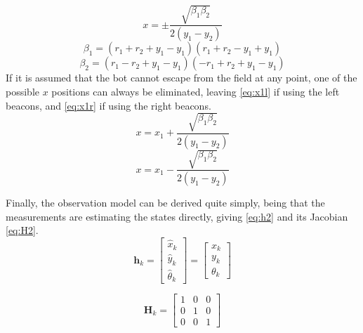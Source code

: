 	\begin{equation}
		x 		= \pm \frac{\sqrt{\beta_{1}\beta_{2}}}{2\left(y_{1}-y_{2}\right)}
	\end{equation}
	\begin{equation}
		\beta_{1} 	= \left(r_{1}+r_{2}+y_{1}-y_{1}\right)\left(r_{1}+r_{2}-y_{1}+y_{1}\right)
	\end{equation}
	\begin{equation}
	\label{eq:beta}
		\beta_{2} 	=\left(r_{1}-r_{2}+y_{1}-y_{1}\right)\left(-r_{1}+r_{2}+y_{1}-y_{1}\right)
	\end{equation}
	If it is assumed that the bot cannot escape from the field at any point, one of the possible $x$ positions can always be eliminated, leaving \ref{eq:x1l} if using the left beacons, and \ref{eq:x1r} if using the right beacons.
	\begin{equation}
	\label{eq:x1l}
		x 		= x_{1}+\frac{\sqrt{\beta_{1}\beta_{2}}}{2\left(y_{1}-y_{2}\right)}
	\end{equation}
	\begin{equation}
	\label{eq:x1r}
		x 		= x_{1}-\frac{\sqrt{\beta_{1}\beta_{2}}}{2\left(y_{1}-y_{2}\right)}
	\end{equation}
	
	Finally, the observation model can be derived quite simply, being that the measurements are estimating the states directly, giving \ref{eq:h2} and its Jacobian \ref{eq:H2}.
	\begin{equation}
	\label{eq:h2}
		\boldsymbol{h}_{ k} =
		\begin{bmatrix}
			\hat{x}_{k} 		\\
			\hat{y}_{k}		\\
			\hat{\theta}_{k}
		\end{bmatrix}
		=
		\begin{bmatrix}
			x_{k}		\\
			y_{k}		\\
			\theta_{k}
		\end{bmatrix}
	\end{equation}
	
	\begin{equation}
	\label{eq:H2}
		\boldsymbol{H}_{k} =
		\begin{bmatrix}
			1	& 0	& 0	\\
			0	& 1	& 0	\\
			0	& 0	& 1
		\end{bmatrix}
	\end{equation}
	
	
